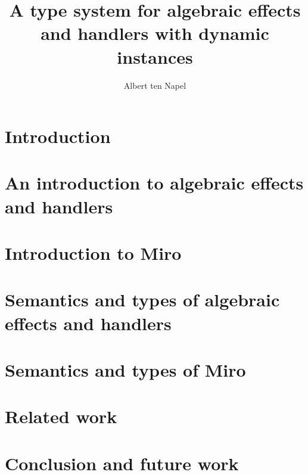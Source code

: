 \documentclass[12pt]{book}
\title{A type system for algebraic effects and handlers with dynamic instances}
\author{Albert ten Napel}
\date{}
\newcommand{\lang}{Miro}
\begin{document}
\maketitle

\tableofcontents
\newpage

\chapter{Introduction}


\chapter[Algebraic effects introduction]{An introduction to algebraic effects and handlers}


\chapter{Introduction to \lang{}}


\chapter[Algebraic effects theory]{Semantics and types of algebraic effects and handlers}


\chapter{Semantics and types of \lang{}}


\chapter{Related work}


\chapter{Conclusion and future work}

% 

\newpage



\end{document}
